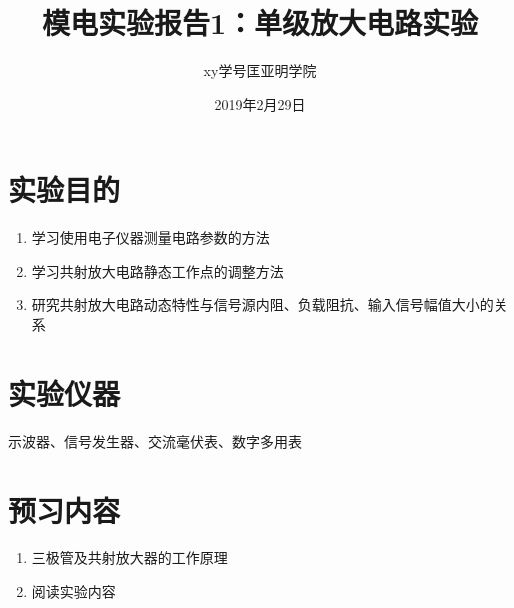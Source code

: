 \documentclass[a4paper]{article}
\title{模电实验报告1：单级放大电路实验}
\author{xy\quad 学号\quad 匡亚明学院}
\date{2019年2月29日}
\begin{document}
\maketitle

\section{实验目的}
\begin{enumerate}
\item 学习使用电子仪器测量电路参数的方法
\item 学习共射放大电路静态工作点的调整方法
\item 研究共射放大电路动态特性与信号源内阻、负载阻抗、输入信号幅值大小的关系
\end{enumerate}
\section{实验仪器}
示波器、信号发生器、交流毫伏表、数字多用表
\section{预习内容}
\begin{enumerate}
\item 三极管及共射放大器的工作原理
\item 阅读实验内容
\end{enumerate}
\end{document}
